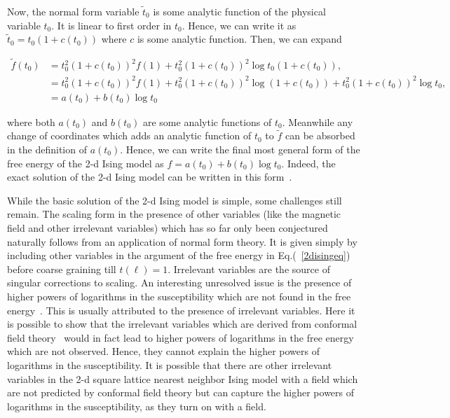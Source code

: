 \documentclass[
 reprint,
 amsmath,amssymb,
 aps, superscriptaddress, pre
]{revtex4-1}
\begin{document}
Now, the normal form variable $\tilde t_0$ is some analytic function of the physical variable $t_0$. It is linear to first order in $t_0$. Hence, we can write it as $\tilde t_0 = t_0 (1 + c(t_0))$ where $c$ is some analytic function. Then, we can expand 
\begin{widetext}
\begin{align}
 \tilde f(t_0) &= t_0^2 (1 + c(t_0))^2 f(1) +  t_0^2 (1 + c(t_0))^2 \log t_0 (1 + c(t_0)) , \\
 &= t_0^2 (1 + c(t_0))^2 f(1) + t_0^2 (1 + c(t_0))^2 \log (1 + c(t_0)) +  t_0^2  (1 + c(t_0))^2 \log t_0 , \\
 &= a(t_0) + b(t_0) \log t_0 
\end{align}
\end{widetext}
where both $a(t_0)$ and $b(t_0)$ are some analytic functions of $t_0$. Meanwhile any change of coordinates which adds an analytic function of $t_0$ to $\tilde f$ can be absorbed in the definition of $a(t_0)$. Hence, we can write the final most general form of the free energy of the 2-d Ising model as $f = a(t_0) + b(t_0) \log t_0$. Indeed, the exact solution of the 2-d Ising model can be written in this form~\cite{caselle2002irrelevant}. 

While the basic solution of the 2-d Ising model is simple, some challenges still remain. The scaling form in the presence of other variables (like the magnetic field and other irrelevant variables) which has so far only been conjectured~\cite{aharony1983nonlinear, caselle2002irrelevant}  naturally follows from an application of normal form theory. It is given simply by including other variables in the argument of the free energy in Eq.(~\ref{2disingeq}) before coarse graining till $t(\ell) = 1$. Irrelevant variables are the source of singular corrections to scaling. An interesting unresolved issue is the presence of higher powers of logarithms in the susceptibility which are not found in the free energy~\cite{orrick2001susceptibility, chan2011ising}. This is usually attributed to the presence of irrelevant variables. Here it is possible to show that the irrelevant variables which are derived from conformal field theory~\cite{caselle2002irrelevant} would in fact lead to higher powers of logarithms in the free energy which are not observed. Hence, they cannot explain the higher powers of logarithms in the susceptibility. It is possible that there are other irrelevant variables in the 2-d square lattice nearest neighbor Ising model with a field which are not predicted by conformal field theory but can capture the higher powers of logarithms in the susceptibility, as they turn on with a field.
\end{document}
